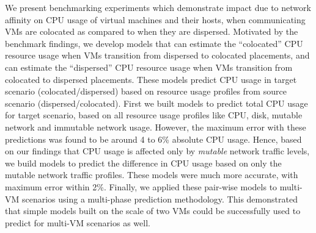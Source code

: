 We present benchmarking experiments
which demonstrate impact due to network affinity
on CPU usage of virtual machines and their hosts, when communicating
VMs are colocated as compared to when they are dispersed. 
Motivated by the benchmark findings, we develop models
that can estimate the ``colocated'' CPU resource usage when VMs transition
from dispersed to colocated placements, and can estimate the ``dispersed''
CPU resource usage when VMs transition from colocated to dispersed
placements. These models predict CPU usage in target
scenario (colocated/dispersed) based on resource usage profiles
from source scenario (dispersed/colocated).
First we built models to predict total CPU usage for target scenario,
based on all resource usage profiles like CPU, disk, mutable network
and immutable network usage. However, the maximum error with these
predictions was found to be around 4 to 6\% absolute CPU usage.
Hence, based on our findings that CPU usage is affected only by
\textit{mutable} network traffic levels, we build models to
predict the difference in CPU usage based on only
the mutable network traffic profiles. These models were much more
accurate, with maximum error within 2\%. Finally, we applied these
pair-wise models to multi-VM scenarios using a multi-phase
prediction methodology. This demonstrated that simple models
built on the scale of two VMs could be successfully used to
predict for multi-VM scenarios as well.
%
